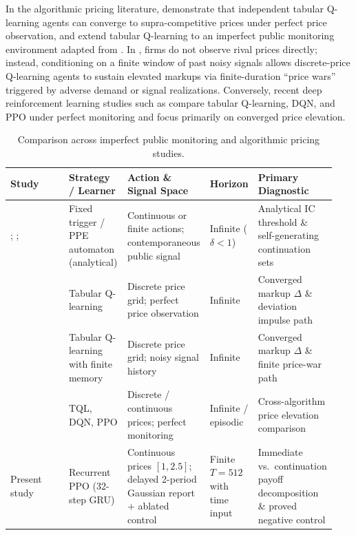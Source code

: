 In the algorithmic pricing literature, \citet{calvano2020artificial} demonstrate that independent tabular Q-learning agents can converge to supra-competitive prices under perfect price observation, and \citet{calvano2021algorithmic} extend tabular Q-learning to an imperfect public monitoring environment adapted from \citet{green1984noncooperative}. In \citet{calvano2021algorithmic}, firms do not observe rival prices directly; instead, conditioning on a finite window of past noisy signals allows discrete-price Q-learning agents to sustain elevated markups via finite-duration ``price wars'' triggered by adverse demand or signal realizations. Conversely, recent deep reinforcement learning studies such as \citet{deng2025exploring} compare tabular Q-learning, DQN, and PPO under perfect monitoring and focus primarily on converged price elevation.

\begin{table}[t]
\centering
\caption{Comparison across imperfect public monitoring and algorithmic pricing studies.}
\label{tab:lit_comparison}
\footnotesize
\begin{tabular}{@{}p{0.21\linewidth}p{0.18\linewidth}p{0.23\linewidth}p{0.11\linewidth}p{0.21\linewidth}@{}}
\toprule
Study & Strategy / Learner & Action \& Signal Space & Horizon & Primary Diagnostic \\
\midrule
\citet{green1984noncooperative}; \citet{abreu1990toward}; \citet{fudenberg1994folk}
  & Fixed trigger / PPE automaton (analytical)
  & Continuous or finite actions; contemporaneous public signal
  & Infinite ($\delta < 1$)
  & Analytical IC threshold \& self-generating continuation sets \\
\addlinespace[3pt]
\citet{calvano2020artificial}
  & Tabular Q-learning
  & Discrete price grid; perfect price observation
  & Infinite
  & Converged markup $\Delta$ \& deviation impulse path \\
\addlinespace[3pt]
\citet{calvano2021algorithmic}
  & Tabular Q-learning with finite memory
  & Discrete price grid; noisy signal history
  & Infinite
  & Converged markup $\Delta$ \& finite price-war path \\
\addlinespace[3pt]
\citet{deng2025exploring}
  & TQL, DQN, PPO
  & Discrete / continuous prices; perfect monitoring
  & Infinite / episodic
  & Cross-algorithm price elevation comparison \\
\addlinespace[3pt]
Present study
  & Recurrent PPO (32-step GRU)
  & Continuous prices $[1,2.5]$; delayed 2-period Gaussian report + ablated control
  & Finite $T=512$ with time input
  & Immediate vs.\ continuation payoff decomposition \& proved negative control \\
\bottomrule
\end{tabular}
\end{table}


